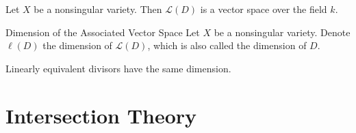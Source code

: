 \documentclass[a4paper]{article}
\begin{document}
\begin{lmm}{}{} Let $X$ be a nonsingular variety. Then $\mathcal{L}(D)$ is a vector space over the field $k$. 
\end{lmm}

\begin{defn}{Dimension of the Associated Vector Space}{} Let $X$ be a nonsingular variety. Denote $\ell(D)$ the dimension of $\mathcal{L}(D)$, which is also called the dimension of $D$. 
\end{defn}

\begin{thm}{}{} Linearly equivalent divisors have the same dimension. 
\end{thm}

\pagebreak
\section{Intersection Theory}
\end{document}
